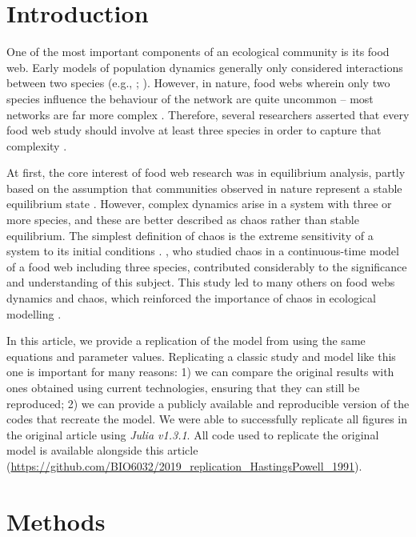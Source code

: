
\section{Introduction}

One of the most important components of an ecological community is its food web.
Early models of population dynamics generally only considered interactions between
two species (e.g., \citet{canale1970}; \citet{rosenzweig1963}). However, in nature, food webs wherein only
two species influence the behaviour of the network are quite uncommon -- most
networks are far more complex \citep{hastings1991}. Therefore, several researchers asserted
that every food web study should involve at least three species in order to capture that
complexity \citep{price1980, rosenzweig1973}.

At first, the core interest of food web research was in equilibrium analysis, partly based
on the assumption that communities observed in nature represent a stable equilibrium state
\citep{hastings1993}.
However, complex dynamics arise in a system with three or more species, and these are better
described as chaos rather than stable equilibrium.
The simplest definition of chaos is the extreme sensitivity of a system to its
initial conditions \citep{hastings1993}.
\citet{hastings1991}, who studied chaos in a continuous-time model of a food web including
three species, contributed considerably to the significance and understanding of this subject.
This study led to many others on food webs dynamics and chaos, which reinforced
the importance of chaos in ecological modelling \citep{blasius1999, gakkhar2012}.

In this article, we provide a replication of the model from \citet{hastings1991} using the
same equations and parameter values.
Replicating a classic study and model like this one is important for many reasons:
1) we can compare the original results with ones obtained using current technologies,
ensuring that they can still be reproduced;
2) we can provide a publicly available and reproducible version of the codes that recreate
the model.
We were able to successfully replicate all figures in the original article using
\textit{Julia v1.3.1}.
All code used to replicate the original model is available alongside this article
(\url{https://github.com/BIO6032/2019_replication_HastingsPowell_1991}).

\section{Methods}

